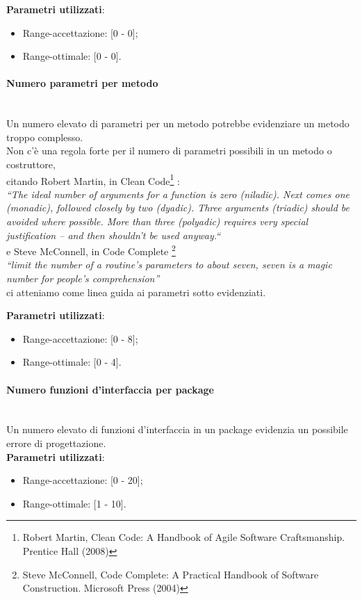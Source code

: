 			\textbf{Parametri utilizzati}:
			\begin{itemize}
				\item Range-accettazione: [0 - 0];
				\item Range-ottimale: [0 - 0].
			\end{itemize}

			
			\paragraph{Numero parametri per metodo}\mbox{} \\
			Un numero elevato di parametri per un metodo potrebbe evidenziare un metodo troppo complesso.\\
			Non c'è una regola forte per il numero di parametri possibili in un metodo o costruttore, \\
			citando Robert Martin, in Clean Code\footnote{Robert Martin, Clean Code: A Handbook of Agile Software Craftsmanship. 	
			Prentice Hall (2008)} : \\ 
			\emph{“The ideal number of arguments for a function is zero (niladic). Next 
			comes 
			one (monadic), followed closely by two (dyadic). Three arguments (triadic) should be avoided where possible. More than 
			three (polyadic) requires very special justification – and then shouldn’t be used anyway.“} \\ 
			e Steve McConnell, in Code Complete \footnote{Steve McConnell, Code Complete: A Practical Handbook of Software
			Construction. Microsoft Press (2004)} \\
			 \emph{“limit the number of a routine’s parameters to about seven, seven is a magic number for people’s comprehension”}  
			\\
			ci atteniamo come linea guida ai parametri sotto evidenziati.
			
			\textbf{Parametri utilizzati}:
			\begin{itemize}
				\item Range-accettazione: [0 - 8];
				\item Range-ottimale: [0 - 4].
			\end{itemize}
			
			
			\paragraph{Numero funzioni d'interfaccia per package}\mbox{} \\
				
			Un numero elevato di funzioni d'interfaccia in un package evidenzia un possibile errore di progettazione.\\
			\textbf{Parametri utilizzati}:
			\begin{itemize}
				\item Range-accettazione: [0 - 20];
				\item Range-ottimale: [1 - 10].
			\end{itemize}

